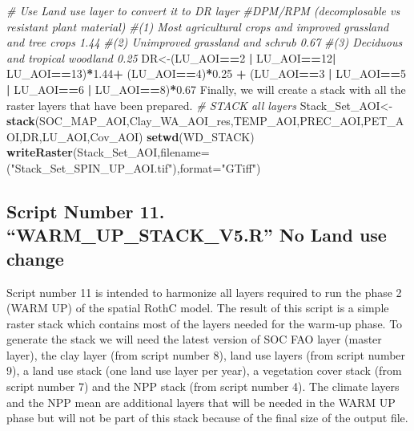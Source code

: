 \documentclass[
  10pt,
  b5paper,
]{book}
\newenvironment{Shaded}{\begin{snugshade}}{\end{snugshade}}
\newcommand{\CommentTok}[1]{\textcolor[rgb]{0.56,0.35,0.01}{\textit{#1}}}
\newcommand{\DataTypeTok}[1]{\textcolor[rgb]{0.13,0.29,0.53}{#1}}
\newcommand{\DecValTok}[1]{\textcolor[rgb]{0.00,0.00,0.81}{#1}}
\newcommand{\FloatTok}[1]{\textcolor[rgb]{0.00,0.00,0.81}{#1}}
\newcommand{\KeywordTok}[1]{\textcolor[rgb]{0.13,0.29,0.53}{\textbf{#1}}}
\newcommand{\NormalTok}[1]{#1}
\newcommand{\OperatorTok}[1]{\textcolor[rgb]{0.81,0.36,0.00}{\textbf{#1}}}
\newcommand{\StringTok}[1]{\textcolor[rgb]{0.31,0.60,0.02}{#1}}
\begin{document}
\begin{Shaded}
\begin{Highlighting}[]
\CommentTok{# Use Land use layer to convert it to DR layer }
\CommentTok{#DPM/RPM (decomplosable vs resistant plant material)}
\CommentTok{#(1) Most agricultural crops and improved grassland and tree crops 1.44 }
\CommentTok{#(2) Unimproved grassland and schrub 0.67}
\CommentTok{#(3) Deciduous and tropical woodland 0.25    }
\NormalTok{DR<-(LU_AOI}\OperatorTok{==}\DecValTok{2} \OperatorTok{|}\StringTok{ }\NormalTok{LU_AOI}\OperatorTok{==}\DecValTok{12}\OperatorTok{|}\StringTok{ }\NormalTok{LU_AOI}\OperatorTok{==}\DecValTok{13}\NormalTok{)}\OperatorTok{*}\FloatTok{1.44}\OperatorTok{+}\StringTok{ }\NormalTok{(LU_AOI}\OperatorTok{==}\DecValTok{4}\NormalTok{)}\OperatorTok{*}\FloatTok{0.25} \OperatorTok{+}\StringTok{ }\NormalTok{(LU_AOI}\OperatorTok{==}\DecValTok{3} \OperatorTok{|}\StringTok{ }\NormalTok{LU_AOI}\OperatorTok{==}\DecValTok{5} \OperatorTok{|}\StringTok{ }\NormalTok{LU_AOI}\OperatorTok{==}\DecValTok{6} \OperatorTok{|}\StringTok{ }\NormalTok{LU_AOI}\OperatorTok{==}\DecValTok{8}\NormalTok{)}\OperatorTok{*}\FloatTok{0.67}
\NormalTok{ Finally, we will create a stack with all the raster layers that have been prepared.}
 \CommentTok{# STACK all layers}
\NormalTok{Stack_Set_AOI<-}\KeywordTok{stack}\NormalTok{(SOC_MAP_AOI,Clay_WA_AOI_res,TEMP_AOI,PREC_AOI,PET_AOI,DR,LU_AOI,Cov_AOI)}
\KeywordTok{setwd}\NormalTok{(WD_STACK)}
\KeywordTok{writeRaster}\NormalTok{(Stack_Set_AOI,}\DataTypeTok{filename=}\NormalTok{(}\StringTok{"Stack_Set_SPIN_UP_AOI.tif"}\NormalTok{),}\DataTypeTok{format=}\StringTok{"GTiff"}\NormalTok{)}
\end{Highlighting}
\end{Shaded}

\hypertarget{script-number-11.-warm_up_stack_v5.r-no-land-use-change}{%
\subsection{Script Number 11. ``WARM\_UP\_STACK\_V5.R'' No Land use change}\label{script-number-11.-warm_up_stack_v5.r-no-land-use-change}}

Script number 11 is intended to harmonize all layers required to run the phase 2 (WARM UP) of the spatial RothC model. The result of this script is a simple raster stack which contains most of the layers needed for the warm-up phase. To generate the stack we will need the latest version of SOC FAO layer (master layer), the clay layer (from script number 8), land use layers (from script number 9), a land use stack (one land use layer per year), a vegetation cover stack (from script number 7) and the NPP stack (from script number 4). The climate layers and the NPP mean are additional layers that will be needed in the WARM UP phase but will not be part of this stack because of the final size of the output file.
\end{document}
